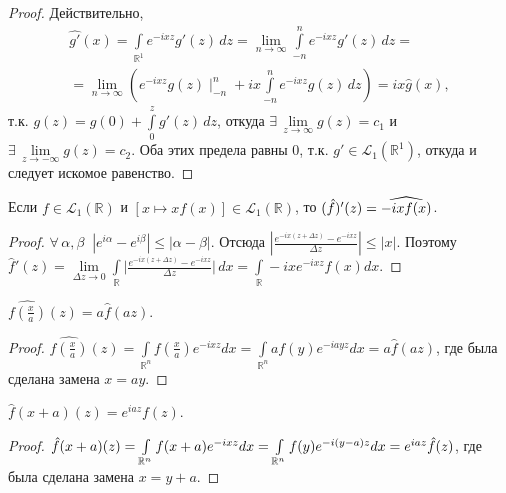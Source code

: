 \documentclass[10pt,titlepage, a4paper]{article}
\begin{document}
\begin{proof}
Действительно,
\begin{multline*}
\widehat{g'}(x)=\int\limits_{\mathbb{R}^1}\!e^{-ixz}g'(z)\,dz=\lim\limits_{n\to\infty}
\int\limits_{-n}^n\!e^{-ixz}g'(z)\,dz=\\=\lim\limits_{n\to\infty}\left(e^{-ixz}g(z)\mid_{-n}^n
+ix\int\limits_{-n}^n\!e^{-ixz}g(z)\,dz\right)=ix\hat{g}(x),
\end{multline*}
т.к. $g(z)=g(0)+\int\limits_{0}^z\!g'(z)\,dz$, откуда
$\exists\,\lim\limits_{z\to\infty}g(z)=c_1$ и
$\exists\,\lim\limits_{z\to-\infty}g(z)=c_2$. Оба этих предела равны
0, т.к. $g'\in\mathcal{L}_1(\mathbb{R}^1)$, откуда и следует искомое
равенство.
\end{proof}

\lecture


\begin{theorem}
Если $f\in \mathcal{L}_1(\mathbb{R})$ и $[x\mapsto xf(x)]\in
\mathcal{L}_1(\mathbb{R})$, то $(\hat f)'(z)\p=\widehat{-ixf(x)}$.
\end{theorem}

\begin{proof}
$\forall\, \alpha, \beta\;\; |e^{i\alpha}-e^{i\beta}|\leqslant
|\alpha-\beta|$. Отсюда $|\frac{e^{-ix(z+\Delta z)}-e^{-ixz}}{\Delta
z}|\leqslant |x|$. Поэтому $\hat f'(z)=\lim\limits_{\Delta z\to
0}\int\limits_{\mathbb{R}} \Big|\frac{e^{-ix(z+\Delta
z)}-e^{-ixz}}{\Delta
z}\Big|\,dx=\int\limits_{\mathbb{R}}-ixe^{-ixz}f(x)dx$.
\end{proof}


\begin{theorem}
$\widehat{f(\frac{x}{a})}(z)=a\hat f(az)$.
\end{theorem}

\begin{proof}
$\widehat{f(\frac{x}{a})}(z)=\int\limits_{\mathbb{R}^n}f(\frac{x}{a})e^{-ixz}dx=
\int\limits_{\mathbb{R}^n}af(y)e^{-iayz}dx=a\hat f(az)$, где была
сделана замена $x=ay$.
\end{proof}

\begin{theorem}
$\hat f(x+a)(z)=e^{iaz}f(z)$.
\end{theorem}

\begin{proof}
$\hat f(x+a)(z)=\int\limits_{\mathbb{R}^n}f(x+a)e^{-ixz}dx\p=
\int\limits_{\mathbb{R}^n}f(y)e^{-i(y-a)z}dx\p=e^{iaz}\hat f(z)$,
где была сделана замена $x=y+a$.
\end{proof}
\end{document}
